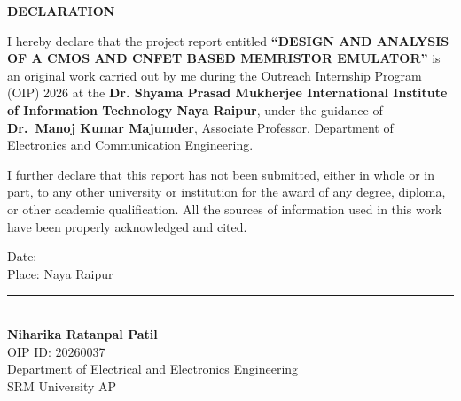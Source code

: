 \thispagestyle{empty}
\vspace*{1.5cm}

\begin{center}
    {\Huge\bfseries DECLARATION}
\end{center}

\vspace{1.5cm}

I hereby declare that the project report entitled \textbf{``DESIGN AND ANALYSIS OF A CMOS AND CNFET BASED MEMRISTOR EMULATOR''} is an original work carried out by me during the Outreach Internship Program (OIP) 2026 at the \textbf{Dr. Shyama Prasad Mukherjee International Institute of Information Technology Naya Raipur}, under the guidance of \textbf{Dr.~Manoj Kumar Majumder}, Associate Professor, Department of Electronics and Communication Engineering.

I further declare that this report has not been submitted, either in whole or in part, to any other university or institution for the award of any degree, diploma, or other academic qualification. All the sources of information used in this work have been properly acknowledged and cited.

\vspace{3cm}

\noindent
\begin{minipage}[t]{0.45\textwidth}
\raggedright
Date: \\[0.4cm]
Place: Naya Raipur
\end{minipage}
\hfill
\begin{minipage}[t]{0.5\textwidth}
\centering
\rule{6cm}{0.4pt} \\[0.2cm]
\textbf{Niharika Ratanpal Patil} \\
OIP ID: 20260037 \\
Department of Electrical and Electronics Engineering \\
SRM University AP
\end{minipage}
